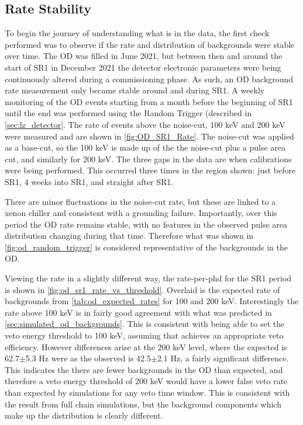 \subsection{Rate Stability}
\par
To begin the journey of understanding what is in the data, the first check performed was to observe if the rate and distribution of backgrounds were stable over time.
The OD was filled in June 2021, but between then and around the start of SR1 in December 2021 the detector electronic parameters were being continuously altered during a commissioning phase.
As such, an OD background rate measurement only became stable around and during SR1.
A weekly monitoring of the OD events starting from a month before the beginning of SR1 until the end was performed using the Random Trigger (described in \autoref{sec:lz_detector}.
The rate of events above the noise-cut, 100 keV and 200 keV were measured and are shown in \autoref{fig:OD_SR1_Rate}.
The noise-cut was applied as a base-cut, so the 100 keV is made up of the the noise-cut plus a pulse area cut, and similarly for 200 keV.
The three gaps in the data are when calibrations were being performed.
This occurred three times in the region shown: just before SR1, 4 weeks into SR1, and straight after SR1.
\par
There are minor fluctuations in the noise-cut rate, but these are linked to a xenon chiller and consistent with a grounding failure.
Importantly, over this period the OD rate remains stable, with no features in the observed pulse area distribution changing during that time.
Therefore what was shown in \autoref{fig:od_random_trigger} is considered representative of the backgrounds in the OD.
\par
Viewing the rate in a slightly different way, the rate-per-phd for the SR1 period is shown in \autoref{fig:od_sr1_rate_vs_threshold}.
Overlaid is the expected rate of backgrounds from \autoref{tab:od_expected_rates} for 100 and 200 keV.
Interestingly the rate above 100 keV is in fairly good agreement with what was predicted in \autoref{sec:simulated_od_backgrounds}.
This is consistent with being able to set the veto energy threshold to 100 keV, assuming that achieves an appropriate veto efficiency.
However differences arise at the 200 keV level, where the expected is 62.7$\pm$5.3 Hz were as the observed is 42.5$\pm$2.1 Hz, a fairly significant difference.
This indicates the there are fewer backgrounds in the OD than expected, and therefore a veto energy threshold of 200 keV would have a lower false veto rate than expected by simulations for any veto time window.
This is consistent with the result from full chain simulations, but the background components which make up the distribution is clearly different.

